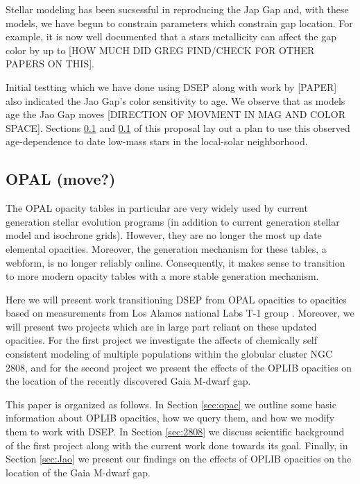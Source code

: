 Stellar modeling has been sucsessful in reproducing the Jap Gap and, with these
models, we have begun to constrain parameters which constrain gap location. For
example, it is now well documented that a stars metallicity can affect the gap
color by up to [HOW MUCH DID GREG FIND/CHECK FOR OTHER PAPERS ON THIS]. 

Initial testting which we have done using DSEP along with work by [PAPER] also
indicated the Jao Gap's color sensitivity to age. We observe that as models age
the Jao Gap moves [DIRECTION OF MOVMENT IN MAG AND COLOR SPACE]. Sections \ref{}
and \ref{} of this proposal lay out a plan to use this observed age-dependence
to date low-mass stars in the local-solar neighborhood.

\subsection{OPAL (move?)}
The OPAL opacity tables in particular are very widely used by current
generation stellar evolution programs (in addition to current generation
stellar model and isochrone grids). However, they are no longer the most up
date elemental opacities. Moreover, the generation mechanism for these tables,
a webform, is no longer reliably online.  Consequently, it makes sense to
transition to more modern opacity tables with a more stable generation
mechanism.

Here we will present work transitioning DSEP from OPAL opacities to opacities
based on measurements from Los Alamos national Labs T-1 group
\citep[OPLIB][]{Colgan2016}. Moreover, we will present two projects which are
in large part reliant on these updated opacities. For the first project we
investigate the affects of chemically self consistent modeling of multiple
populations within the globular cluster NGC 2808, and for the second project we
present the effects of the OPLIB opacities on the location of the recently
discovered Gaia M-dwarf gap.

This paper is organized as follows. In Section \ref{sec:opac} we outline some
basic information about OPLIB opacities, how we query them, and how we modify
them to work with DSEP. In Section \ref{sec:2808} we discuss scientific
background of the first project along with the current work done towards its
goal. Finally, in Section \ref{sec:Jao} we present our findings on the effects
of OPLIB opacities on the location of the Gaia M-dwarf gap.






